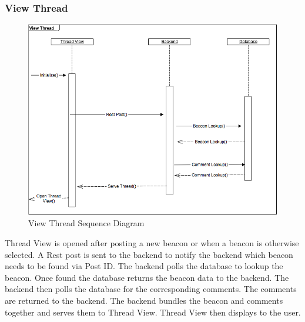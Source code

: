         \subsubsection{View Thread}
            \begin{figure}[H]
                \centering
                \includegraphics[width=\textwidth]{src/img/view-thread.png}
                \caption{View Thread Sequence Diagram} 
            \end{figure}

            Thread View is opened after posting a new beacon or when a beacon is
            otherwise selected. A Rest post is sent to the backend to notify the
            backend which beacon needs to be found via Post ID. The backend
            polls the database to lookup the beacon. Once found the database
            returns the beacon data to the backend. The backend then polls the
            database for the corresponding comments. The comments are returned
            to the backend. The backend bundles the beacon and comments together
            and serves them to Thread View. Thread View then displays to the
            user. 

